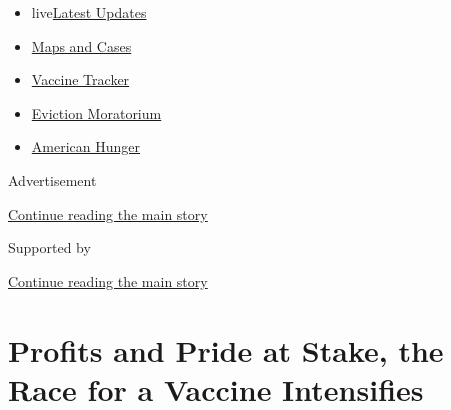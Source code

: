\begin{itemize}
\tightlist
\item
  live\href{https://www.nytimes3xbfgragh.onion/2020/09/08/world/covid-19-coronavirus.html?name=styln-coronavirus-national\&region=TOP_BANNER\&block=storyline_menu_recirc\&action=click\&pgtype=Article\&impression_id=cd9498d0-f273-11ea-85e4-7f6370b9a399\&variant=undefined}{Latest
  Updates}
\item
  \href{https://www.nytimes3xbfgragh.onion/interactive/2020/us/coronavirus-us-cases.html?name=styln-coronavirus-national\&region=TOP_BANNER\&block=storyline_menu_recirc\&action=click\&pgtype=Article\&impression_id=cd9498d1-f273-11ea-85e4-7f6370b9a399\&variant=undefined}{Maps
  and Cases}
\item
  \href{https://www.nytimes3xbfgragh.onion/interactive/2020/science/coronavirus-vaccine-tracker.html?name=styln-coronavirus-national\&region=TOP_BANNER\&block=storyline_menu_recirc\&action=click\&pgtype=Article\&impression_id=cd9498d2-f273-11ea-85e4-7f6370b9a399\&variant=undefined}{Vaccine
  Tracker}
\item
  \href{https://www.nytimes3xbfgragh.onion/2020/09/02/your-money/eviction-moratorium-covid.html?name=styln-coronavirus-national\&region=TOP_BANNER\&block=storyline_menu_recirc\&action=click\&pgtype=Article\&impression_id=cd9498d3-f273-11ea-85e4-7f6370b9a399\&variant=undefined}{Eviction
  Moratorium}
\item
  \href{https://www.nytimes3xbfgragh.onion/interactive/2020/09/02/magazine/food-insecurity-hunger-us.html?name=styln-coronavirus-national\&region=TOP_BANNER\&block=storyline_menu_recirc\&action=click\&pgtype=Article\&impression_id=cd9498d4-f273-11ea-85e4-7f6370b9a399\&variant=undefined}{American
  Hunger}
\end{itemize}

Advertisement

\protect\hyperlink{after-top}{Continue reading the main story}

Supported by

\protect\hyperlink{after-sponsor}{Continue reading the main story}

\hypertarget{profits-and-pride-at-stake-the-race-for-a-vaccine-intensifies}{%
\section{Profits and Pride at Stake, the Race for a Vaccine
Intensifies}\label{profits-and-pride-at-stake-the-race-for-a-vaccine-intensifies}}

